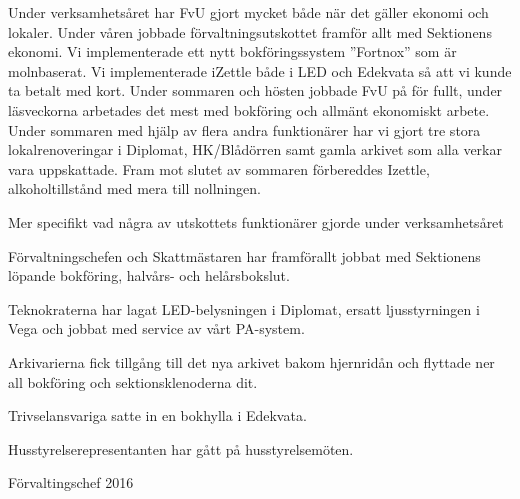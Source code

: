 \documentclass[../_main/handlingar.tex]{subfiles}
\begin{document}
Under verksamhetsåret har FvU gjort mycket både när det gäller ekonomi och lokaler. Under våren jobbade förvaltningsutskottet framför allt med Sektionens ekonomi. Vi implementerade ett nytt bokföringssystem ”Fortnox” som är molnbaserat. Vi implementerade iZettle både i LED och Edekvata så att vi kunde ta betalt med kort. Under sommaren och hösten jobbade FvU på för fullt, under läsveckorna arbetades det mest med bokföring och allmänt ekonomiskt arbete. Under sommaren med hjälp av flera andra funktionärer har vi gjort tre stora lokalrenoveringar i Diplomat, HK/Blådörren samt gamla arkivet som alla verkar vara uppskattade. Fram mot slutet av sommaren förbereddes Izettle, alkoholtillstånd med mera till nollningen.

Mer specifikt vad några av utskottets funktionärer gjorde under verksamhetsåret
\begin{dashlist}
  \item Förvaltningschefen och Skattmästaren har framförallt jobbat med Sektionens löpande bokföring, halvårs- och helårsbokslut.
  \item Teknokraterna har lagat LED-belysningen i Diplomat, ersatt ljusstyrningen i Vega  och jobbat med service av vårt PA-system.
  \item Arkivarierna fick tillgång till det nya arkivet bakom hjernridån och flyttade ner all bokföring och sektionsklenoderna dit.
  \item Trivselansvariga satte in en bokhylla i Edekvata.
  \item Husstyrelserepresentanten har gått på husstyrelsemöten.
\end{dashlist}


\begin{signatures}{1}
    \mvh
    \signature{Anders Nilsson}{Förvaltingschef 2016}
\end{signatures}
\end{document}
